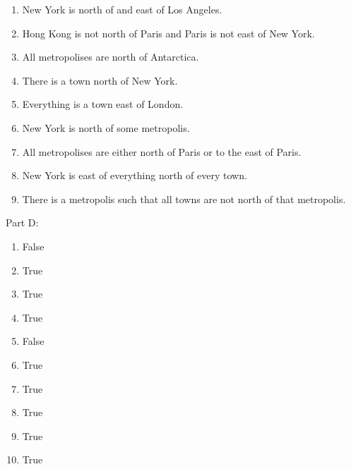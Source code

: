 \documentclass[
]{book}
\providecommand{\tightlist}{%
  \setlength{\itemsep}{0pt}\setlength{\parskip}{0pt}}
\begin{document}
\begin{enumerate}
\def\labelenumi{\arabic{enumi}.}
\tightlist
\item
  New York is north of and east of Los Angeles.
\item
  Hong Kong is not north of Paris and Paris is not east of New York.
\item
  All metropolises are north of Antarctica.
\item
  There is a town north of New York.
\item
  Everything is a town east of London.
\item
  New York is north of some metropolis.
\item
  All metropolises are either north of Paris or to the east of Paris.
\item
  New York is east of everything north of every town.
\item
  There is a metropolis such that all towns are not north of that metropolis.
\end{enumerate}

Part D:

\begin{enumerate}
\def\labelenumi{\arabic{enumi}.}
\tightlist
\item
  False
\item
  True
\item
  True
\item
  True
\item
  False
\item
  True
\item
  True
\item
  True
\item
  True
\item
  True
\end{enumerate}

  
\end{document}
